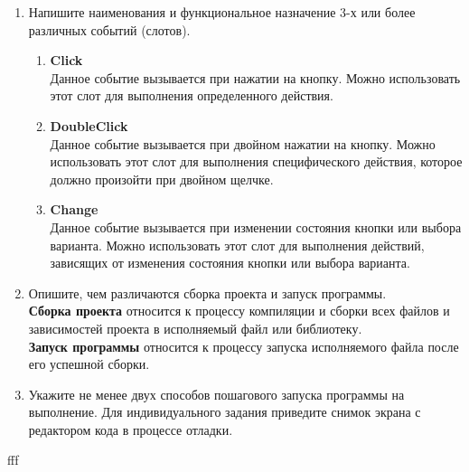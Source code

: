 \documentclass[a4paper,14pt]{extreport} %
\begin{document}
\begin{enumerate}
		\item Напишите наименования и функциональное назначение 3-х или
		более различных событий (слотов).
		\begin{enumerate}
			\item \textbf{Click}\\
			Данное событие вызывается при нажатии на кнопку. Можно использовать этот слот для выполнения определенного действия.
			\item \textbf{DoubleClick}\\
			Данное событие вызывается при двойном нажатии на кнопку. Можно использовать этот слот для выполнения специфического действия, которое должно произойти при двойном щелчке.
			\item \textbf{Change}\\
			Данное событие вызывается при изменении состояния кнопки или выбора варианта. Можно использовать этот слот для выполнения действий, зависящих от изменения состояния кнопки или выбора варианта.
		\end{enumerate}
		
		\item Опишите, чем различаются сборка проекта и запуск программы.\\
		\textbf{Сборка проекта} относится к процессу компиляции и сборки всех файлов и зависимостей проекта в исполняемый файл или библиотеку.\\ \textbf{Запуск программы} относится к процессу запуска исполняемого файла после его успешной сборки. 
		
		\item Укажите не менее двух способов пошагового запуска программы
		на выполнение. Для индивидуального задания приведите снимок экрана с
		редактором кода в процессе отладки.
	
	\end{enumerate}
	
	
	\setcounter{page}{2} 
	\newpage
	fff
\end{document}
